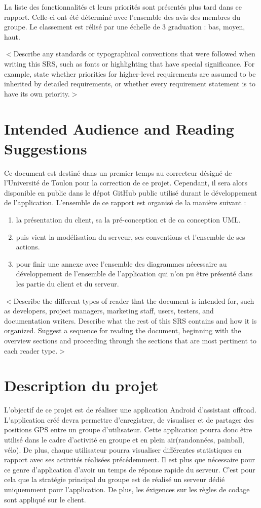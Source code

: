 \documentclass[titlepage, 12pt]{report}
\begin{document}
La liste des fonctionnalités et leurs priorités sont présentés plus tard dans ce rapport. Celle-ci 
ont été déterminé avec l'ensemble des avis des membres du groupe. Le classement est rélisé par une échelle
de 3 graduation : bas, moyen, haut.

$<$Describe any standards or typographical conventions that were followed when 
writing this SRS, such as fonts or highlighting that have special significance.  
For example, state whether priorities  for higher-level requirements are assumed 
to be inherited by detailed requirements, or whether every requirement statement 
is to have its own priority.$>$

\section{Intended Audience and Reading Suggestions}

Ce document est destiné dans un premier temps au correcteur désigné de l'Université de Toulon pour la correction de ce projet.
Cependant, il sera alors disponible en public dans le dépot GitHub public utilisé durant le développement de l'application.
L'ensemble de ce rapport est organisé de la manière suivant :
\begin{enumerate}
	\item la présentation du client, sa la pré-conception et de ca conception UML.
	\item puis vient la modélisation du serveur, ses conventions et l'ensemble de ses actions.
	\item pour finir  une annexe avec l'ensemble des diagrammes nécessaire au développement de l'ensemble de l'application qui n'on pu être présenté
dans les partie du client et du serveur.
\end{enumerate}

$<$Describe the different types of reader that the document is intended for, 
such as developers, project managers, marketing staff, users, testers, and 
documentation writers. Describe what the rest of this SRS contains and how it is 
organized. Suggest a sequence for reading the document, beginning with the 
overview sections and proceeding through the sections that are most pertinent to 
each reader type.$>$

\section{Description du projet}

L'objectif de ce projet est de réaliser une application Android d'assistant offroad.
L'application créé devra permettre d'enregistrer, de visualiser et de partager des positions GPS entre un groupe d'utilisateur. Cette application pourra donc être utilisé dans le cadre d'activité en groupe et en plein air(randonnées, painball, vélo). 
De plus, chaque utilisateur pourra visualiser différentes statistiques en rapport avec ses activités réalisées précédemment.
Il est plus que nécessaire pour ce genre d'application d'avoir un temps de réponse rapide du serveur. C'est pour cela que la stratégie
principal du groupe est de réalisé un serveur dédié uniquemment pour l'application.
De plus, les éxigences sur les règles de codage sont appliqué sur le client.
\end{document}

